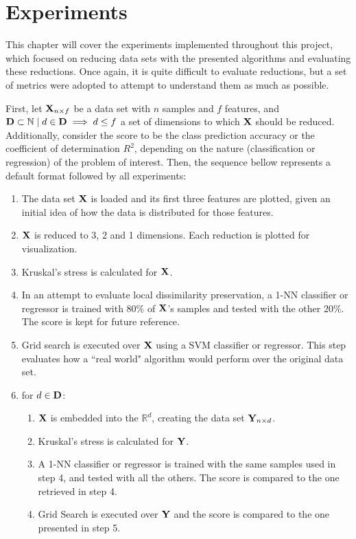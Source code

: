 \chapter{Experiments}
\label{sec:experiments}

This chapter will cover the experiments implemented throughout this project, which focused on reducing data sets with the presented algorithms and evaluating these reductions. Once again, it is quite difficult to evaluate reductions, but a set of metrics were adopted to attempt to understand them as much as possible.

First, let $\mathbf{X}_{n \times f}$ be a data set with $n$ samples and $f$ features, and $\mathbf{D} \subset \mathbb{N} \mid d \in \mathbf{D} \implies d \le f$ a  set of dimensions to which $\mathbf{X}$ should be reduced. Additionally, consider the score to be the class prediction accuracy or the coefficient of determination $R^2$, depending on the nature (classification or regression) of the problem of interest. Then, the sequence bellow represents a default format followed by all experiments:

\begin{enumerate}
	\item The data set $\mathbf{X}$ is loaded and its first three features are plotted, given an initial idea of how the data is distributed for those features.
	\item $\mathbf{X}$ is reduced to 3, 2 and 1 dimensions. Each reduction is plotted for visualization.
	\item Kruskal's stress is calculated for $\mathbf{X}$.
	\item In an attempt to evaluate local dissimilarity preservation, a 1-NN classifier or regressor is trained with 80\% of $\mathbf{X}$'s samples and tested with the other 20\%. The score is kept for future reference.
	\item Grid search is executed over $\mathbf{X}$ using a SVM classifier or regressor. This step evaluates how a ``real world" algorithm would perform over the original data set.
	\item for $d \in \mathbf{D}$:
	\begin{enumerate}
		\item $\mathbf{X}$ is embedded into the $\mathbb{R}^d$, creating the data set $\mathbf{Y}_{n \times d}$.
		\item Kruskal's stress is calculated for $\mathbf{Y}$.
		\item A 1-NN classifier or regressor is trained with the same samples used in step 4, and tested with all the others. The score is compared to the one retrieved in step 4.
		\item Grid Search is executed over $\mathbf{Y}$ and the score is compared to the one presented in step 5.
	\end{enumerate}
\end{enumerate}


